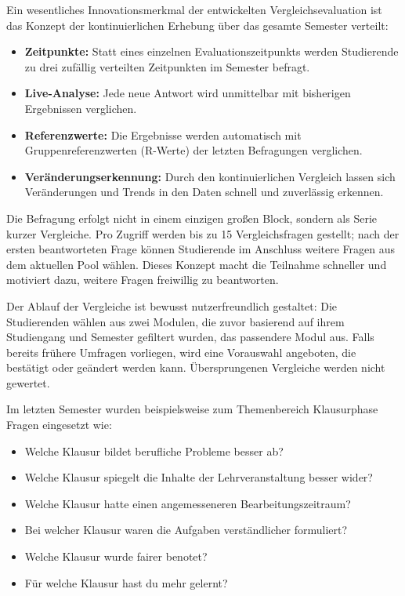 \documentclass[12pt,a4paper,oneside]{article}
\begin{document}
Ein wesentliches Innovationsmerkmal der entwickelten Vergleichsevaluation ist das Konzept der kontinuierlichen Erhebung über das gesamte Semester verteilt:

\begin{itemize}
    \item \textbf{Zeitpunkte:} Statt eines einzelnen Evaluationszeitpunkts werden Studierende zu drei zufällig verteilten Zeitpunkten im Semester befragt.
    \item \textbf{Live-Analyse:} Jede neue Antwort wird unmittelbar mit bisherigen Ergebnissen verglichen.
    \item \textbf{Referenzwerte:} Die Ergebnisse werden automatisch mit Gruppenreferenzwerten (R-Werte) der letzten Befragungen verglichen.
    \item \textbf{Veränderungserkennung:} Durch den kontinuierlichen Vergleich lassen sich Veränderungen und Trends in den Daten schnell und zuverlässig erkennen.
\end{itemize}

Die Befragung erfolgt nicht in einem einzigen großen Block, sondern als Serie kurzer Vergleiche. Pro Zugriff werden bis zu 15 Vergleichsfragen gestellt; nach der ersten beantworteten Frage können Studierende im Anschluss weitere Fragen aus dem aktuellen Pool wählen. Dieses Konzept macht die Teilnahme schneller und motiviert dazu, weitere Fragen freiwillig zu beantworten.

Der Ablauf der Vergleiche ist bewusst nutzerfreundlich gestaltet: Die Studierenden wählen aus zwei Modulen, die zuvor basierend auf ihrem Studiengang und Semester gefiltert wurden, das passendere Modul aus. Falls bereits frühere Umfragen vorliegen, wird eine Vorauswahl angeboten, die bestätigt oder geändert werden kann. Übersprungenen Vergleiche werden nicht gewertet.

Im letzten Semester wurden beispielsweise zum Themenbereich Klausurphase Fragen eingesetzt wie:

\begin{itemize}
    \item Welche Klausur bildet berufliche Probleme besser ab?
    \item Welche Klausur spiegelt die Inhalte der Lehrveranstaltung besser wider?
    \item Welche Klausur hatte einen angemesseneren Bearbeitungszeitraum?
    \item Bei welcher Klausur waren die Aufgaben verständlicher formuliert?
    \item Welche Klausur wurde fairer benotet?
    \item Für welche Klausur hast du mehr gelernt?
\end{itemize}
\end{document}
